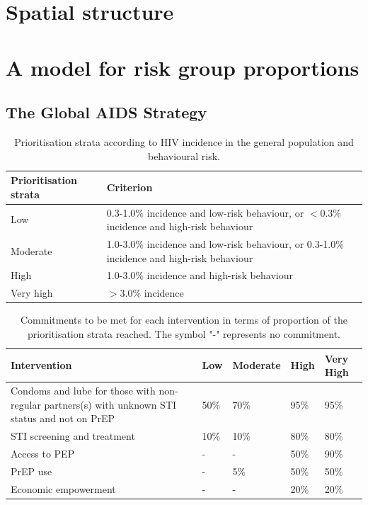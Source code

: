 \documentclass[a4paper, nobind]{templates/ociamthesis}
\begin{document}
\startappendices

\hypertarget{spatial-structure}{%
\chapter{Spatial structure}\label{spatial-structure}}

\hypertarget{a-model-for-risk-group-proportions}{%
\chapter{A model for risk group proportions}\label{a-model-for-risk-group-proportions}}

\hypertarget{the-global-aids-strategy}{%
\section{The Global AIDS Strategy}\label{the-global-aids-strategy}}

\begin{table}[h]
\centering
\begin{tabularx}{\textwidth}{lX}
\toprule
Prioritisation strata & Criterion  \\
\midrule
Low & 0.3-1.0\% incidence and low-risk behaviour, or $<$0.3\% incidence and high-risk behaviour \\
Moderate & 1.0-3.0\% incidence and low-risk behaviour, or 0.3-1.0\% incidence and high-risk behaviour \\
High & 1.0-3.0\% incidence and high-risk behaviour \\
Very high & $>$3.0\% incidence \\
\bottomrule
\end{tabularx}
\caption{Prioritisation strata according to HIV incidence in the general population and behavioural risk.}
\label{tab:unaids-strategy-prioritisation}
\end{table}

\begin{table}[h]
\centering
\begin{tabularx}{\textwidth}{p{8cm}XXXX}
\toprule
Intervention & Low & Moderate & High & Very High \\
\midrule
Condoms and lube for those with non-regular partners(s) with unknown STI status and not on PrEP & 50\% & 70\% & 95\% & 95\% \\
STI screening and treatment & 10\% & 10\% & 80\% & 80\% \\
Access to PEP & - & - & 50\% & 90\% \\
PrEP use & - & 5\% & 50\% & 50\% \\
Economic empowerment & - & - & 20\% & 20\% \\
\bottomrule
\end{tabularx}
\caption{Commitments to be met for each intervention in terms of proportion of the prioritisation strata reached. The symbol "-" represents no commitment.}
\label{tab:unaids-strategy-targets}
\end{table}
\end{document}
